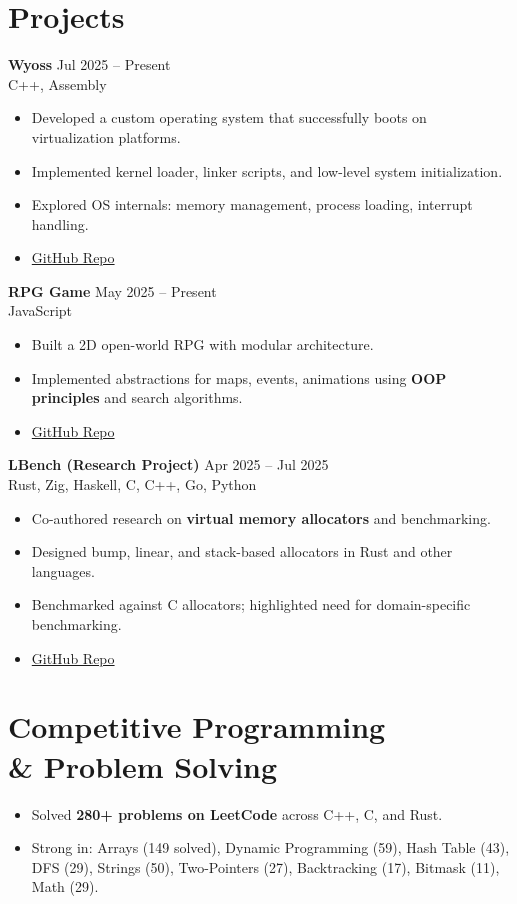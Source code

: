 \documentclass[a4paper,10pt]{article}
\begin{document}
\section*{Projects}
\textbf{Wyoss} \hfill Jul 2025 -- Present \\
C++, Assembly
\begin{itemize}[noitemsep, topsep=2pt]
    \item Developed a custom operating system that successfully boots on virtualization platforms.
    \item Implemented kernel loader, linker scripts, and low-level system initialization.
    \item Explored OS internals: memory management, process loading, interrupt handling.
    \item \href{https://github.com/haibaaa/wyoss}{GitHub Repo}
\end{itemize}

\textbf{RPG Game} \hfill May 2025 -- Present \\
JavaScript
\begin{itemize}[noitemsep, topsep=2pt]
    \item Built a 2D open-world RPG with modular architecture.
    \item Implemented abstractions for maps, events, animations using \textbf{OOP principles} and search algorithms.
    \item \href{https://github.com/haibaaa/rpg}{GitHub Repo}
\end{itemize}

\textbf{LBench (Research Project)} \hfill Apr 2025 -- Jul 2025 \\
Rust, Zig, Haskell, C, C++, Go, Python
\begin{itemize}[noitemsep, topsep=2pt]
    \item Co-authored research on \textbf{virtual memory allocators} and benchmarking.
    \item Designed bump, linear, and stack-based allocators in Rust and other languages.
    \item Benchmarked against C allocators; highlighted need for domain-specific benchmarking.
    \item \href{https://github.com/nandhra702/lbench}{GitHub Repo}
\end{itemize}

\section*{Competitive Programming \\ & Problem Solving}
\begin{itemize}[noitemsep, topsep=2pt]
    \item Solved \textbf{280+ problems on LeetCode} across C++, C, and Rust.
    \item Strong in: Arrays (149 solved), Dynamic Programming (59), Hash Table (43), DFS (29), Strings (50), Two-Pointers (27), Backtracking (17), Bitmask (11), Math (29).
\end{itemize}
\end{document}
